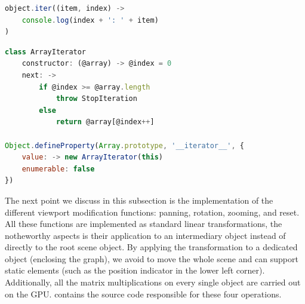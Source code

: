 \begin{lstlisting}[caption={Simple iteration over an iterable object.},label=lst:iteration,language=javascript]
object.iter((item, index) ->
    console.log(index + ': ' + item)
)
\end{lstlisting}

\begin{lstlisting}[caption={Extension of the \texttt{Array} object with the iterator pattern.},label=lst:array-iter,language=javascript]
class ArrayIterator
    constructor: (@array) -> @index = 0
    next: ->
        if @index >= @array.length
            throw StopIteration
        else
            return @array[@index++]

Object.defineProperty(Array.prototype, '__iterator__', {
    value: -> new ArrayIterator(this)
    enumerable: false
})
\end{lstlisting}

The next point we discuss in this subsection is the implementation of the different viewport modification functions: panning, rotation, zooming, and reset. All these functions are implemented as standard linear transformations, the notheworthy aspects is their application to an intermediary object instead of directly to the root scene object. By applying the transformation to a dedicated object (enclosing the graph), we avoid to move the whole scene and can support static elements (such as the position indicator in the lower left corner). Additionally, all the matrix multiplications on every single object are carried out on the GPU.  contains the source code responsible for these four operations.

